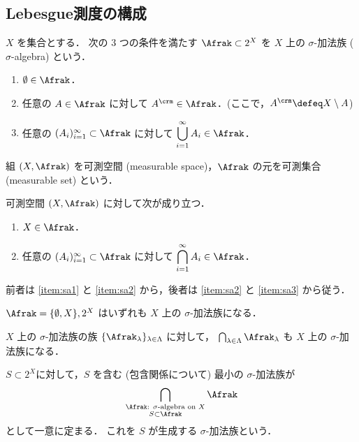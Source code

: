 \subsection{Lebesgue測度の構成}

\begin{definition}
    $X$ を集合とする．
    次の $3$ つの条件を満たす $\Afrak\subset2^X$ を $X$ 上の $\sigma$-加法族 ($\sigma$-algebra) という．
    \begin{enumerate}[label=\textsf{(SA\arabic*)},align=left]
        \item\label{item:sa1} $\emptyset\in\Afrak$．
        \item\label{item:sa2} 任意の $A\in\Afrak$ に対して $A^\crm\in\Afrak$．\quad (ここで，$A^\crm\defeq X\setminus A$)
        \item\label{item:sa3} 任意の $(A_i)_{i=1}^\infty\subset\Afrak$ に対して $\displaystyle\bigcup_{i=1}^\infty A_i\in\Afrak$．
    \end{enumerate}
    組 $(X,\Afrak)$ を可測空間 (measurable space)，$\Afrak$ の元を可測集合 (measurable set) という．
\end{definition}

\begin{remark}
    可測空間 $(X,\Afrak)$ に対して次が成り立つ．
    \begin{enumerate}
        \item $X\in\Afrak$．
        \item 任意の $(A_i)_{i=1}^\infty\subset\Afrak$ に対して $\displaystyle\bigcap_{i=1}^\infty A_i\in\Afrak$．
    \end{enumerate}
    前者は \ref{item:sa1} と \ref{item:sa2} から，後者は \ref{item:sa2} と \ref{item:sa3} から従う．
\end{remark}

\begin{example}
    $\Afrak=\{\emptyset,X\},2^X$ はいずれも $X$ 上の $\sigma$-加法族になる．
\end{example}

\begin{example}
    $X$ 上の $\sigma$-加法族の族 $\{\Afrak_\lambda\}_{\lambda\in\Lambda}$ に対して，
        $\bigcap_{\lambda\in\Lambda}\Afrak_\lambda$
    も $X$ 上の $\sigma$-加法族になる．

    $S\subset 2^X$に対して，$S$ を含む (包含関係について) 最小の $\sigma$-加法族が
    \begin{align*}
        \bigcap_{\substack{\text{$\Afrak$: $\sigma$-algebra on $X$}\\S\subset\Afrak}}\Afrak
    \end{align*}
    として一意に定まる．
    これを $S$ が生成する $\sigma$-加法族という．
\end{example}

